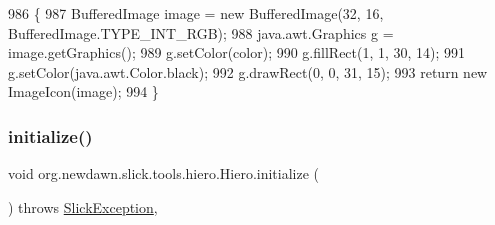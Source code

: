 \begin{DoxyCode}
986                                                     \{
987         BufferedImage image = \textcolor{keyword}{new} BufferedImage(32, 16, BufferedImage.TYPE\_INT\_RGB);
988         java.awt.Graphics g = image.getGraphics();
989         g.setColor(color);
990         g.fillRect(1, 1, 30, 14);
991         g.setColor(java.awt.Color.black);
992         g.drawRect(0, 0, 31, 15);
993         \textcolor{keywordflow}{return} \textcolor{keyword}{new} ImageIcon(image);
994     \}
\end{DoxyCode}
\mbox{\label{classorg_1_1newdawn_1_1slick_1_1tools_1_1hiero_1_1_hiero_a03f0e98d12c2117ec8521ded2b737c99}} 
\subsubsection{\texorpdfstring{initialize()}{initialize()}}
{\footnotesize\ttfamily void org.\+newdawn.\+slick.\+tools.\+hiero.\+Hiero.\+initialize (\begin{DoxyParamCaption}{ }\end{DoxyParamCaption}) throws \mbox{\hyperlink{classorg_1_1newdawn_1_1slick_1_1_slick_exception}{Slick\+Exception}}\hspace{0.3cm}{\ttfamily [inline]}, {\ttfamily [package]}}


